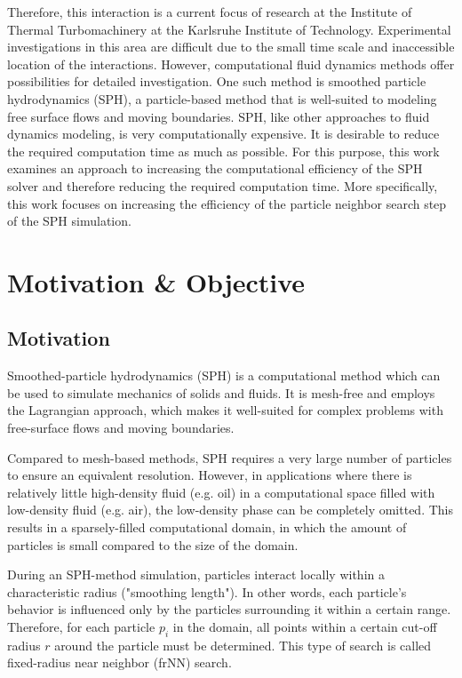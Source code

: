 Therefore, this interaction is a current focus of research at the Institute of Thermal Turbomachinery at the Karlsruhe Institute of Technology.  Experimental investigations in this area are difficult due to the small time scale and inaccessible location of the interactions. However, computational fluid dynamics methods offer possibilities for detailed investigation. One such method is smoothed particle hydrodynamics (SPH), a particle-based method that is well-suited to modeling free surface flows and moving boundaries.  SPH, like other approaches to fluid dynamics modeling, is very computationally expensive. It is desirable to reduce the required computation time as much as possible. For this purpose, this work examines an approach to increasing the computational efficiency of the SPH solver and therefore reducing the required computation time. More specifically, this work focuses on increasing the efficiency of the particle neighbor search step of the SPH simulation.  

\chapter{Motivation \& Objective}

\section{Motivation}
\label{SECTION:Motivation}
Smoothed-particle hydrodynamics (SPH) is a computational method which can be used to simulate mechanics of solids and fluids.  It is mesh-free and employs the Lagrangian approach, which makes it well-suited for complex problems with free-surface flows and moving boundaries.

Compared to mesh-based methods, SPH requires a very large number of particles to ensure an equivalent resolution.  However, in applications where there is relatively little high-density fluid (e.g.  oil) in a computational space filled with low-density fluid (e.g.  air), the low-density phase can be completely omitted.  This results in a sparsely-filled computational domain, in which the amount of particles is small compared to the size of the domain.

During an SPH-method simulation, particles interact locally within a characteristic radius ("smoothing length").  In other words, each particle's behavior is influenced only by the particles surrounding it within a certain range.  Therefore, for each particle $p_i$ in the domain, all points within a certain cut-off radius $r$ around the particle must be determined.  This type of search is called fixed-radius near neighbor (frNN) search.

